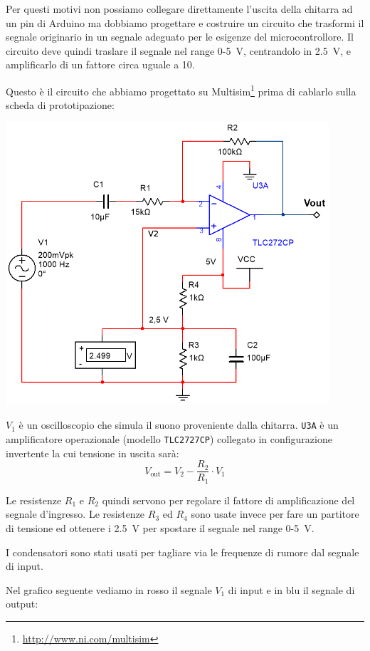 \documentclass[a4paper,11pt]{article}
\begin{document}
Per questi motivi non possiamo collegare direttamente l'uscita della chitarra ad un pin di Arduino ma dobbiamo progettare e costruire un circuito che trasformi il segnale originario in un segnale adeguato per le esigenze del microcontrollore. Il circuito deve quindi traslare il segnale nel range \num{0}-\SI{5}{\volt}, centrandolo in \SI{2.5}{\volt}, e amplificarlo di un fattore circa uguale a \num{10}.

Questo è il circuito che abbiamo progettato su Multisim\footnote{\url{http://www.ni.com/multisim}} prima di cablarlo sulla scheda di prototipazione:

\begin{center}
\includegraphics[width=0.9\textwidth]{screen.png}
\end{center}

$V_1$ è un oscilloscopio che simula il suono proveniente dalla chitarra. \texttt{U3A} è un amplificatore operazionale (modello \texttt{TLC2727CP}) collegato in configurazione invertente la cui tensione in uscita sarà: $$V_{\mathrm{out}} = V_2 - \frac{R_2}{R_1} \cdot V_1$$

Le resistenze $R_1$ e $R_2$ quindi servono per regolare il fattore di amplificazione del segnale d'ingresso. Le resistenze $R_3$ ed $R_4$ sono usate invece per fare un partitore di tensione ed ottenere i \SI{2.5}{\volt} per spostare il segnale nel range \num{0}-\SI{5}{\volt}.

I condensatori sono stati usati per tagliare via le frequenze di rumore dal segnale di input.

\vspace{0.2in}
Nel grafico seguente vediamo in rosso il segnale $V_1$ di input e in blu il segnale di output:
\vspace{0.1in}
\end{document}

